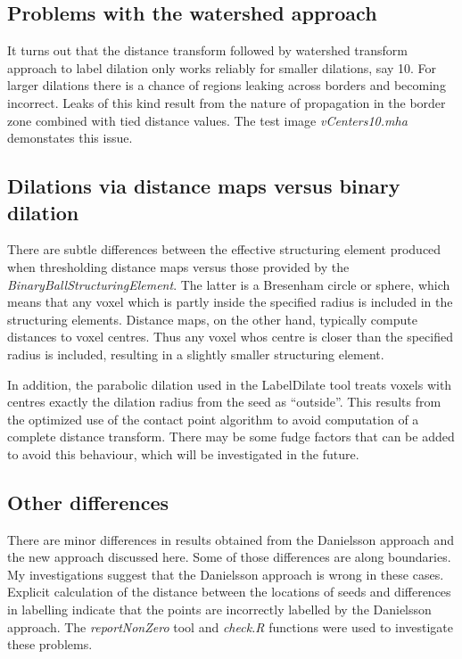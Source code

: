 \documentclass{InsightArticle}
\begin{document}
\subsection{Problems with the watershed approach}
It turns out that the distance transform followed by watershed
transform approach to label dilation only works reliably for smaller
dilations, say 10. For larger dilations there is a chance of regions
leaking across borders and becoming incorrect. Leaks of this kind
result from the nature of propagation in the border zone combined with
tied distance values. The test image {\em vCenters10.mha} demonstates
this issue.

\subsection{Dilations via distance maps versus binary dilation}
There are subtle differences between the effective structuring element
produced when thresholding distance maps versus those provided by the
{\em BinaryBallStructuringElement}. The latter is a Bresenham circle
or sphere, which means that any voxel which is partly inside the
specified radius is included in the structuring elements. Distance
maps, on the other hand, typically compute distances to voxel
centres. Thus any voxel whos centre is closer than the specified
radius is included, resulting in a slightly smaller structuring
element.

In addition, the parabolic dilation used in the LabelDilate tool
treats voxels with centres exactly the dilation radius from the seed
as ``outside''. This results from the optimized use of the contact
point algorithm to avoid computation of a complete distance
transform. There may be some fudge factors that can be added to avoid
this behaviour, which will be investigated in the future.

\subsection{Other differences}
There are minor differences in results obtained from the Danielsson
approach and the new approach discussed here. Some of those
differences are along boundaries. My investigations suggest that the
Danielsson approach is wrong in these cases. Explicit calculation of
the distance between the locations of seeds and differences in
labelling indicate that the points are incorrectly labelled by the
Danielsson approach. The {\em reportNonZero} tool and {\em check.R}
functions were used to investigate these problems.
\end{document}
